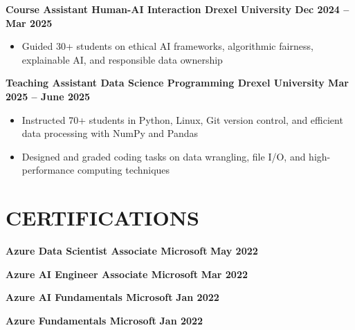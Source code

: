 \documentclass[10pt]{article}
\begin{document}
\noindent
\textbf{Course Assistant \textbar{} Human-AI Interaction \textbar{} Drexel University  \hfill Dec 2024 -- Mar 2025} \\
\vspace{-0.4cm}
\begin{itemize}[leftmargin=0.6cm, itemsep=-0.1cm, topsep=0cm]

    \item Guided 30+ students on ethical AI frameworks, algorithmic fairness, explainable AI, and responsible data ownership

\end{itemize}

\noindent
\textbf{Teaching Assistant \textbar{} Data Science Programming \textbar{} Drexel University  \hfill Mar 2025 -- June 2025} \\
\vspace{-0.4cm}
\begin{itemize}[leftmargin=0.6cm, itemsep=-0.1cm, topsep=0cm]

    \item Instructed 70+ students in Python, Linux, Git version control, and efficient data processing with NumPy and Pandas

    \item Designed and graded coding tasks on data wrangling, file I/O, and high-performance computing techniques

\end{itemize}



\vspace{-0.4cm} 
\section*{CERTIFICATIONS} 
\vspace{-0.2cm}

\noindent
\textbf{Azure Data Scientist Associate \textbar{} Microsoft } \hfill \textbf{May 2022 }

\noindent
\textbf{Azure AI Engineer Associate \textbar{} Microsoft } \hfill \textbf{Mar 2022 }

\noindent
\textbf{Azure AI Fundamentals \textbar{} Microsoft } \hfill \textbf{Jan 2022 }

\noindent
\textbf{Azure Fundamentals \textbar{} Microsoft } \hfill \textbf{Jan 2022 }
\end{document}
